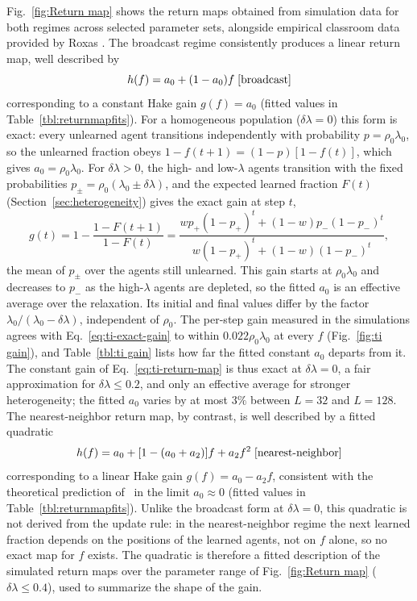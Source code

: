 \documentclass[a4paper,fleqn]{cas-sc}
\begin{document}
    Fig.~\ref{fig:Return map} shows the return maps obtained from simulation data for both regimes across selected parameter sets, alongside empirical classroom data provided by Roxas \citep{monterola2009}.
    The broadcast regime consistently produces a linear return map, well described by
    \begin{equation}
        h(f) = a_0 + (1-a_0)f \;{\rm [broadcast]}
        \label{eq:ti-return-map}
    \end{equation}
    corresponding to a constant Hake gain $g(f) = a_0$ (fitted values in Table~\ref{tbl:returnmapfits}).
    For a homogeneous population ($\delta\lambda=0$) this form is exact: every unlearned agent transitions independently with probability $p=\rho_0\lambda_0$, so the unlearned fraction obeys $1-f(t+1)=(1-p)[1-f(t)]$, which gives $a_0=\rho_0\lambda_0$.
    For $\delta\lambda>0$, the high- and low-$\lambda$ agents transition with the fixed probabilities $p_\pm=\rho_0(\lambda_0\pm\delta\lambda)$, and the expected learned fraction $F(t)$ (Section~\ref{sec:heterogeneity}) gives the exact gain at step $t$,
    \begin{equation}
        g(t)=1-\frac{1-F(t+1)}{1-F(t)}=\frac{w p_+(1-p_+)^t+(1-w)p_-(1-p_-)^t}{w(1-p_+)^t+(1-w)(1-p_-)^t},
    \label{eq:ti-exact-gain}
    \end{equation}
    the mean of $p_\pm$ over the agents still unlearned.
    This gain starts at $\rho_0\lambda_0$ and decreases to $p_-$ as the high-$\lambda$ agents are depleted, so the fitted $a_0$ is an effective average over the relaxation.
    Its initial and final values differ by the factor $\lambda_0/(\lambda_0-\delta\lambda)$, independent of $\rho_0$.
    The per-step gain measured in the simulations agrees with Eq.~\eqref{eq:ti-exact-gain} to within $0.022\rho_0\lambda_0$ at every $f$ (Fig.~\ref{fig:ti gain}), and Table~\ref{tbl:ti gain} lists how far the fitted constant $a_0$ departs from it.
    The constant gain of Eq.~\eqref{eq:ti-return-map} is thus exact at $\delta\lambda=0$, a fair approximation for $\delta\lambda\leq0.2$, and only an effective average for stronger heterogeneity; the fitted $a_0$ varies by at most $3\%$ between $L=32$ and $L=128$.
    The nearest-neighbor return map, by contrast, is well described by a fitted quadratic
    \begin{equation}
        h(f) = a_0 + [1-(a_0+a_2)]f + a_2f^2 \;{\rm [nearest\text{-}neighbor]}
    \end{equation}
    corresponding to a linear Hake gain $g(f) = a_0 - a_2 f$, consistent with the theoretical prediction of~\citet{nitta2019mathematical} in the limit $a_0 \approx 0$ (fitted values in Table~\ref{tbl:returnmapfits}).
    Unlike the broadcast form at $\delta\lambda=0$, this quadratic is not derived from the update rule: in the nearest-neighbor regime the next learned fraction depends on the positions of the learned agents, not on $f$ alone, so no exact map for $f$ exists.
    The quadratic is therefore a fitted description of the simulated return maps over the parameter range of Fig.~\ref{fig:Return map} ($\delta\lambda\leq0.4$), used to summarize the shape of the gain.
\end{document}
